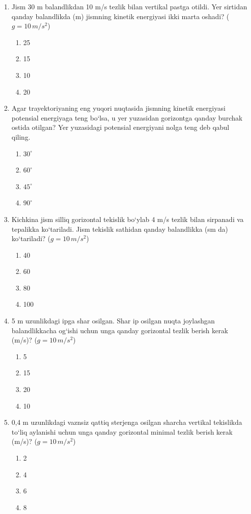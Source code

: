 \begin{enumerate}
\item Jism 30 m balandlikdan 10 m/s tezlik bilan vertikal pastga otildi. Yer sirtidan qanday balandlikda (m) jismning kinetik energiyasi ikki marta oshadi? ($g = 10 \, m/s^2$)
\begin{enumerate}[label=\Alph*)]
\item 25
\item 15
\item 10
\item 20
\end{enumerate}

\item Agar trayektoriyaning eng yuqori nuqtasida jismning kinetik energiyasi potensial energiyaga teng bo‘lsa, u yer yuzasidan gorizontga qanday burchak ostida otilgan? Yer yuzasidagi potensial energiyani nolga teng deb qabul qiling.
\begin{enumerate}[label=\Alph*)]
\item $30^\circ$
\item $60^\circ$
\item $45^\circ$
\item $90^\circ$
\end{enumerate}

\item Kichkina jism silliq gorizontal tekislik bo‘ylab 4 m/s tezlik bilan sirpanadi va tepalikka ko‘tariladi. Jism tekislik sathidan qanday balandlikka (sm da) ko‘tariladi? ($g = 10 \, m/s^2$)
\begin{enumerate}[label=\Alph*)]
\item 40
\item 60
\item 80
\item 100
\end{enumerate}

\item 5 m uzunlikdagi ipga shar osilgan. Shar ip osilgan nuqta joylashgan balandlikkacha og‘ishi uchun unga qanday gorizontal tezlik berish kerak (m/s)? ($g = 10 \, m/s^2$)
\begin{enumerate}[label=\Alph*)]
\item 5
\item 15
\item 20
\item 10
\end{enumerate}

\item 0,4 m uzunlikdagi vaznsiz qattiq sterjenga osilgan sharcha vertikal tekislikda to‘liq aylanishi uchun unga qanday gorizontal minimal tezlik berish kerak (m/s)? ($g = 10 \, m/s^2$)
\begin{enumerate}[label=\Alph*)]
\item 2
\item 4
\item 6
\item 8
\end{enumerate}


\end{enumerate}
